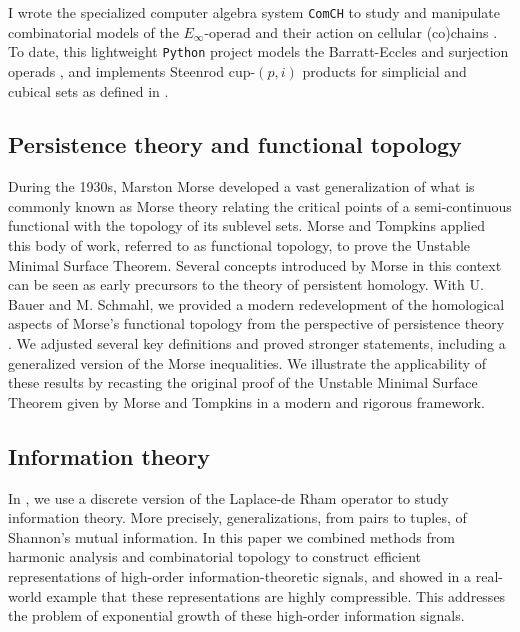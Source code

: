 I wrote the specialized computer algebra system \texttt{ComCH} to study and manipulate combinatorial models of the $E_\infty$-operad and their action on cellular (co)chains \cite{medina2021computer}.
To date, this lightweight \texttt{Python} project models the Barratt-Eccles and surjection operads \cite{mcclure2003multivariable,berger2004combinatorial}, and implements Steenrod cup-$(p,i)$ products for simplicial and cubical sets as defined in \cite{medina2021maysteenrod}.

\subsection{Persistence theory and functional topology}

During the 1930s, Marston Morse developed a vast generalization of what is commonly known as Morse theory relating the critical points of a semi-continuous functional with the topology of its sublevel sets.
Morse and Tompkins applied this body of work, referred to as functional topology, to prove the Unstable Minimal Surface Theorem.
Several concepts introduced by Morse in this context can be seen as early precursors to the theory of persistent homology.
With U. Bauer and M. Schmahl, we provided a modern redevelopment of the homological aspects of Morse's functional topology from the perspective of persistence theory \cite{medina2021functional}.
We adjusted several key definitions and proved stronger statements, including a generalized version of the Morse inequalities.
We illustrate the applicability of these results by recasting the original proof of the Unstable Minimal Surface Theorem given by Morse and Tompkins in a modern and rigorous framework.

\subsection{Information theory}

In \cite{medina2021hyperharmonic}, we use a discrete version of the Laplace-de Rham operator to study information theory.
More precisely, generalizations, from pairs to tuples, of Shannon's mutual information.
In this paper we combined methods from harmonic analysis and combinatorial topology to construct efficient representations of high-order information-theoretic signals, and showed in a real-world example that these representations are highly compressible.
This addresses the problem of exponential growth of these high-order information signals.
